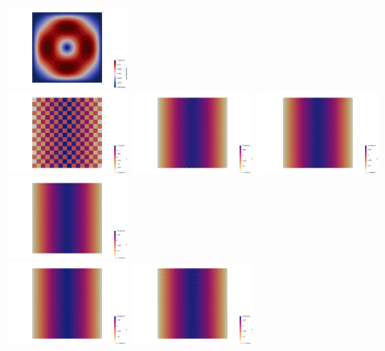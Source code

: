 \begin{center}
\includegraphics[width=4cm]{python_codes/fieldstone_78/results/mms_dh/16x16/vel0007}\\
\includegraphics[width=4cm]{python_codes/fieldstone_78/results/mms_dh/16x16/p0}
\includegraphics[width=4cm]{python_codes/fieldstone_78/results/mms_dh/16x16/p1}
\includegraphics[width=4cm]{python_codes/fieldstone_78/results/mms_dh/16x16/p2}
\includegraphics[width=4cm]{python_codes/fieldstone_78/results/mms_dh/16x16/p3}\\
\includegraphics[width=4cm]{python_codes/fieldstone_78/results/mms_dh/16x16/p4}
\includegraphics[width=4cm]{python_codes/fieldstone_78/results/mms_dh/16x16/p5}

\end{center}
